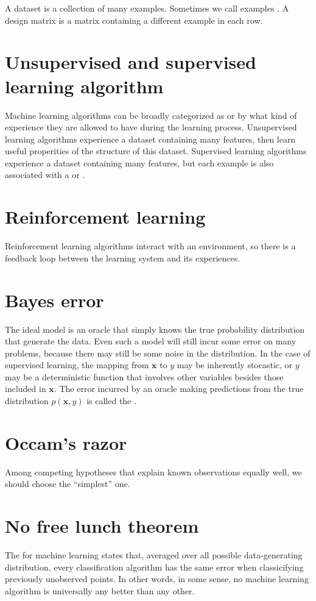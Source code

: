 A dataset is a collection of many examples.
Sometimes we call examples .
A design matrix is a matrix containing a different example in each row.

\section{Unsupervised and supervised learning algorithm}

Machine learning algorithms can be broadly categorized as  or  by what kind of experience they are allowed to have during the learning process.
Unsupervised learning algorithms experience a dataset containing many features, then learn useful properities of the structure of this dataset.
Supervised learning algorithms experience a dataset containing many features, but each example is also associated with a  or .

\section{Reinforcement learning}

Reinforcement learning algorithms interact with an environment, so there is a feedback loop between the learning system and its experiences.


\section{Bayes error}

The ideal model is an oracle that simply knows the true probability distribution that generate the data.
Even such a model will still incur some error on many problems, because there may still be some noise in the distribution.
In the case of supervised learning, the mapping from $\bm{x}$ to $y$ may be inherently stocastic, or $y$ may be a deterministic function that involves other variables besides those included in $\bm{x}$.
The error incurred by an oracle making predictions from the true distribution $p(\bm{x},y)$ is called the .


\section{Occam's razor}

Among competing hypotheses that explain known observations equally well, we should choose the ``simplest'' one.


\section{No free lunch theorem}

The  for machine learning states that, averaged over all possible data-generating distribution, every classification algorithm has the same error when classicifying previously unobserved points.
In other words, in some sense, no machine learning algorithm is universally any better than any other.
